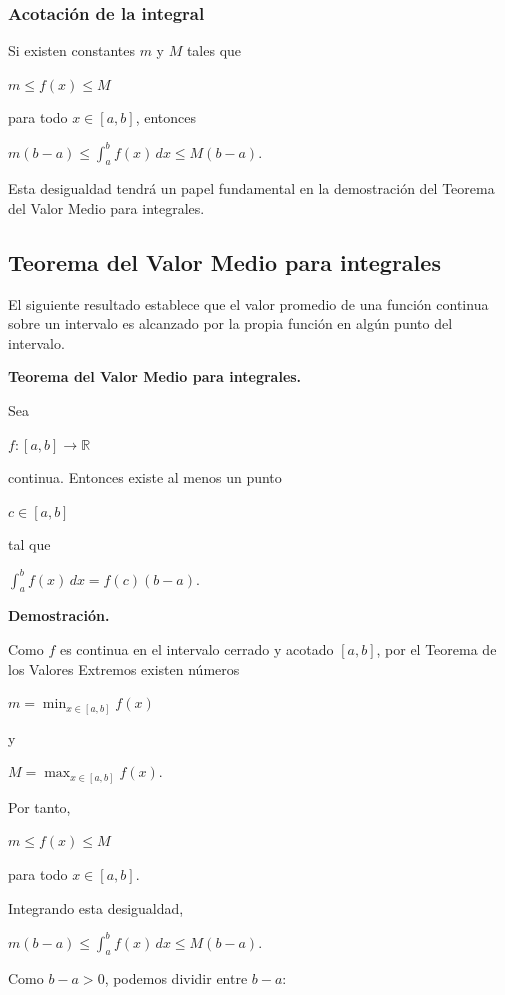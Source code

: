 \documentclass[12pt]{article}
\begin{document}
\subsubsection*{Acotación de la integral}

Si existen constantes $m$ y $M$ tales que

$
m\leq f(x)\leq M
$

para todo $x\in[a,b]$, entonces

$
\boxed{
m(b-a)
\leq
\int_a^b f(x)\,dx
\leq
M(b-a).
}
$

Esta desigualdad tendrá un papel fundamental en la demostración del
Teorema del Valor Medio para integrales.

\subsection*{Teorema del Valor Medio para integrales}

El siguiente resultado establece que el valor promedio de una función
continua sobre un intervalo es alcanzado por la propia función en algún
punto del intervalo.

\textbf{Teorema del Valor Medio para integrales.}

Sea

$
f:[a,b]\longrightarrow\mathbb{R}
$

continua. Entonces existe al menos un punto

$
c\in[a,b]
$

tal que

$
\boxed{
\int_a^b f(x)\,dx
=
f(c)(b-a).
}
$

\textbf{Demostración.}

Como $f$ es continua en el intervalo cerrado y acotado $[a,b]$, por el
Teorema de los Valores Extremos existen números

$
m=\min_{x\in[a,b]}f(x)
$

y

$
M=\max_{x\in[a,b]}f(x).
$

Por tanto,

$
m\leq f(x)\leq M
$

para todo $x\in[a,b]$.

Integrando esta desigualdad,

$
m(b-a)
\leq
\int_a^b f(x)\,dx
\leq
M(b-a).
$

Como $b-a>0$, podemos dividir entre $b-a$:
\end{document}
